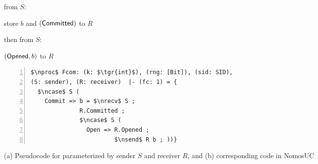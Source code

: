 \begin{figure}
\centering
\begin{minipage}{0.38\textwidth}
\begin{bbox}[title={Functionality $\F_{\m{com}}(S, R)$}]

\OnInput {} from $S$: 

\qquad store $b$ and \Send $(\mathsf{Committed})$ to $R$

then \OnInput {} from $S$: 

\qquad \Send $(\mathsf{Opened}, b)$ to $R$
\end{bbox}
\end{minipage}
\hspace{3em}
\begin{minipage}{0.5\textwidth}
\begin{lstlisting}[basicstyle=\scriptsize\BeraMonottFamily, frame=single, mathescape, numbers=left, xleftmargin=2em, xrightmargin=2em]
$\nproc$ Fcom: (k: $\tgr{int}$), (rng: [Bit]), (sid: SID),
(S: sender), (R: receiver)  |- (fc: 1) = {
  $\ncase$ S (
    Commit => b = $\nrecv$ S ;
              R.Committed ;
              $\ncase$ S (
                Open => R.Opened ;
                        $\nsend$ R b ; ))}
\end{lstlisting}
\end{minipage}
\caption{(a) Pseudocode for \Fcom parameterized by sender $S$ and receiver $R$,
and (b) corresponding code in NomosUC}
\label{fig:fcomideal}
\vspace{-4mm}
\end{figure}
